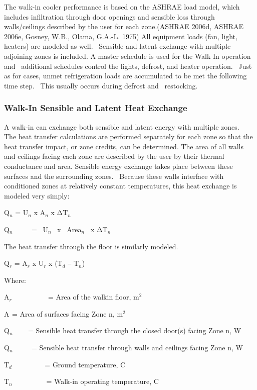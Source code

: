 The walk-in cooler performance is based on the ASHRAE load model, which includes infiltration through door openings and sensible loss through walls/ceilings described by the user for each zone.(ASHRAE 2006d, ASHRAE 2006e, Gosney, W.B., Olama, G.A.-L. 1975) All equipment loads (fan, light, heaters) are modeled as well.~ Sensible and latent exchange with multiple adjoining zones is included. A master schedule is used for the Walk In operation and~ additional schedules control the lights, defrost, and heater operation. ~Just as for cases, unmet refrigeration loads are accumulated to be met the following time step.~ This usually occurs during defrost and ~restocking.

\subsubsection{Walk-In Sensible and Latent Heat Exchange}\label{walk-in-sensible-and-latent-heat-exchange}

A walk-in can exchange both sensible and latent energy with multiple zones.~ The heat transfer calculations are performed separately for each zone so that the heat transfer impact, or zone credits, can be determined. The area of all walls and ceilings facing each zone are described by the user by their thermal conductance and area. Sensible energy exchange takes place between these surfaces and the surrounding zones.~ Because these walls interface with conditioned zones at relatively constant temperatures, this heat exchange is modeled very simply:

Q\(_{n}\) = U\(_{n}\) x A\(_{n}\) x ΔT\(_{n}\)

Q\(_{n}\) ~~~~ = ~U\(_{n}\)~ x~ Area\(_{n}\) ~x ΔT\(_{n}\)

The heat transfer through the floor is similarly modeled.

Q\(_{r}\) = A\(_{r}\) x U\(_{r}\) x (T\(_{d}\) -- T\(_{n}\))

Where:

A\(_{r}\) ~~~~~~~~~ = Area of the walkin floor, m\(^{2}\)

A\(_{ }\) = Area of surfaces facing Zone n, m\(^{2}\)

Q\(_{n}\) ~~~ = Sensible heat transfer through the closed door(s) facing Zone n, W

Q\(_{n}\) ~~~~ = Sensible heat transfer through walls and ceilings facing Zone n, W

T\(_{d}\) ~~~~~~~~ = Ground temperature, C

T\(_{n}\)~~~~~~~~~ = Walk-in operating temperature, C


